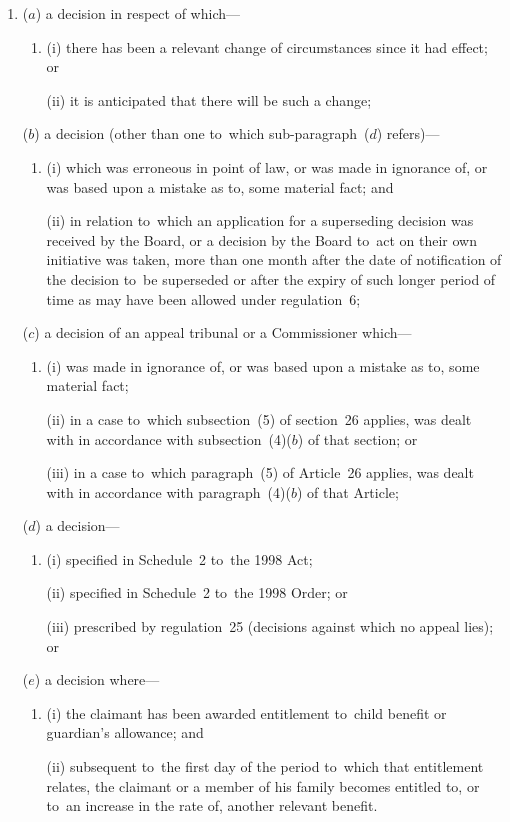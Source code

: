 \documentclass[12pt,a4paper]{article}
\begin{document}
\begin{enumerate}\item[]
($a$) a decision in respect of which—
\begin{enumerate}\item[]
(i) there has been a relevant change of circumstances since it had effect; or

(ii) it is anticipated that there will be such a change;
\end{enumerate}

($b$) a decision (other than one to~which sub-paragraph~($d$)  refers)—
\begin{enumerate}\item[]
(i) which was erroneous in point of law, or was made in ignorance of, or was based upon a mistake as to, some material fact; and

(ii) in relation to~which an application for a superseding decision was received by the Board, or a decision by the Board to~act on their own initiative was taken, more than one month after the date of notification of the decision to~be superseded or after the expiry of such longer period of time as may have been allowed under regulation~6;
\end{enumerate}

($c$) a decision of an appeal tribunal or a Commissioner which—
\begin{enumerate}\item[]
(i) was made in ignorance of, or was based upon a mistake as to, some material fact;

(ii) in a case to~which subsection~(5) of section~26 applies, was dealt with in accordance with subsection~(4)($b$)  of that section; or

(iii) in a case to~which paragraph~(5) of Article~26 applies, was dealt with in accordance with paragraph~(4)($b$)  of that Article;
\end{enumerate}

($d$) a decision—
\begin{enumerate}\item[]
(i) specified in Schedule~2 to~the 1998 Act;

(ii) specified in Schedule~2 to~the 1998 Order; or

(iii) prescribed by regulation~25 (decisions against which no appeal lies); or
\end{enumerate}

($e$) a decision where—
\begin{enumerate}\item[]
(i) the claimant has been awarded entitlement to~child benefit or guardian’s allowance; and

(ii) subsequent to~the first day of the period to~which that entitlement relates, the claimant or a member of his family becomes entitled to, or to~an increase in the rate of, another relevant benefit.
\end{enumerate}
\end{enumerate}
\end{document}
